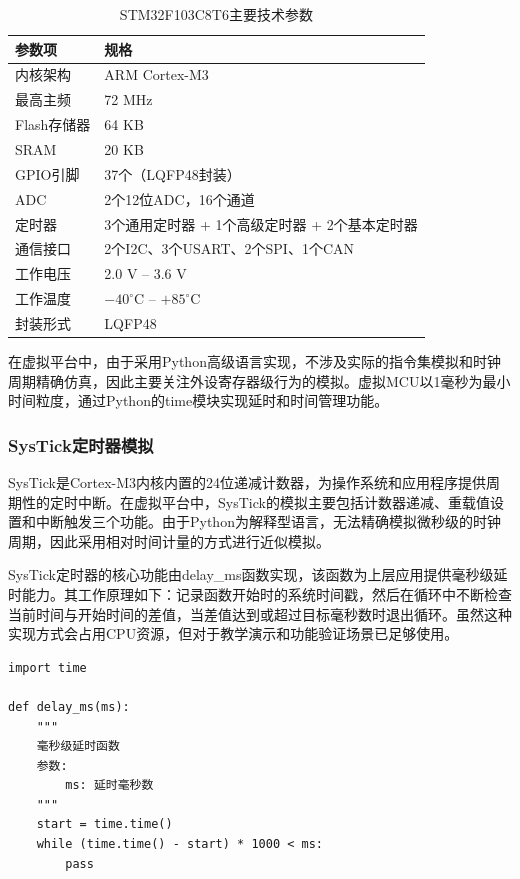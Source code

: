 \documentclass[12pt,a4paper]{ctexart}
\begin{document}
\begin{table}[H]
    \centering
    \caption{STM32F103C8T6主要技术参数}
    \label{tab:stm32params}
    \begin{tabular}{@{}ll@{}}
        \toprule
        \textbf{参数项} & \textbf{规格} \\
        \midrule
        内核架构 & ARM Cortex-M3 \\
        最高主频 & 72 MHz \\
        Flash存储器 & 64 KB \\
        SRAM & 20 KB \\
        GPIO引脚 & 37个（LQFP48封装） \\
        ADC & 2个12位ADC，16个通道 \\
        定时器 & 3个通用定时器 + 1个高级定时器 + 2个基本定时器 \\
        通信接口 & 2个I2C、3个USART、2个SPI、1个CAN \\
        工作电压 & 2.0 V -- 3.6 V \\
        工作温度 & $-40^\circ$C -- $+85^\circ$C \\
        封装形式 & LQFP48 \\
        \bottomrule
    \end{tabular}
\end{table}

在虚拟平台中，由于采用Python高级语言实现，不涉及实际的指令集模拟和时钟周期精确仿真，因此主要关注外设寄存器级行为的模拟。虚拟MCU以1毫秒为最小时间粒度，通过Python的time模块实现延时和时间管理功能。

\subsubsection{SysTick定时器模拟}

SysTick是Cortex-M3内核内置的24位递减计数器，为操作系统和应用程序提供周期性的定时中断。在虚拟平台中，SysTick的模拟主要包括计数器递减、重载值设置和中断触发三个功能。由于Python为解释型语言，无法精确模拟微秒级的时钟周期，因此采用相对时间计量的方式进行近似模拟。

SysTick定时器的核心功能由delay\_ms函数实现，该函数为上层应用提供毫秒级延时能力。其工作原理如下：记录函数开始时的系统时间戳，然后在循环中不断检查当前时间与开始时间的差值，当差值达到或超过目标毫秒数时退出循环。虽然这种实现方式会占用CPU资源，但对于教学演示和功能验证场景已足够使用。

\begin{lstlisting}[caption={虚拟delay\_ms函数实现},label={lst:delay}]
import time

def delay_ms(ms):
    """
    毫秒级延时函数
    参数:
        ms: 延时毫秒数
    """
    start = time.time()
    while (time.time() - start) * 1000 < ms:
        pass
\end{lstlisting}
\end{document}
